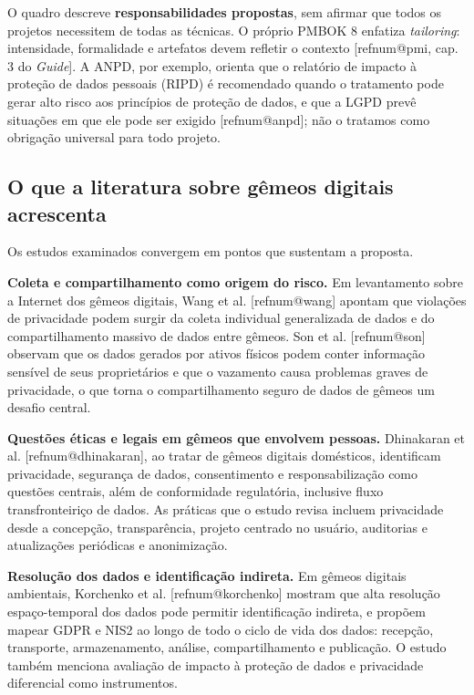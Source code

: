 \documentclass[11pt,a4paper]{article}
\makeatletter
\newcommand{\refnum}[1]{\csname refnum@#1\endcsname}
\makeatother
\begin{document}
O quadro descreve \textbf{responsabilidades propostas}, sem afirmar que todos os projetos necessitem de todas as técnicas. O próprio PMBOK 8 enfatiza \textit{tailoring}: intensidade, formalidade e artefatos devem refletir o contexto [\refnum{pmi}, cap. 3 do \textit{Guide}]. A ANPD, por exemplo, orienta que o relatório de impacto à proteção de dados pessoais (RIPD) é recomendado quando o tratamento pode gerar alto risco aos princípios de proteção de dados, e que a LGPD prevê situações em que ele pode ser exigido [\refnum{anpd}]; não o tratamos como obrigação universal para todo projeto.
\subsection{O que a literatura sobre gêmeos digitais acrescenta}

Os estudos examinados convergem em pontos que sustentam a proposta.

\textbf{Coleta e compartilhamento como origem do risco.} Em levantamento sobre a Internet dos gêmeos digitais, Wang et al. [\refnum{wang}] apontam que violações de privacidade podem surgir da coleta individual generalizada de dados e do compartilhamento massivo de dados entre gêmeos. Son et al. [\refnum{son}] observam que os dados gerados por ativos físicos podem conter informação sensível de seus proprietários e que o vazamento causa problemas graves de privacidade, o que torna o compartilhamento seguro de dados de gêmeos um desafio central.

\textbf{Questões éticas e legais em gêmeos que envolvem pessoas.} Dhinakaran et al. [\refnum{dhinakaran}], ao tratar de gêmeos digitais domésticos, identificam privacidade, segurança de dados, consentimento e responsabilização como questões centrais, além de conformidade regulatória, inclusive fluxo transfronteiriço de dados. As práticas que o estudo revisa incluem privacidade desde a concepção, transparência, projeto centrado no usuário, auditorias e atualizações periódicas e anonimização.

\textbf{Resolução dos dados e identificação indireta.} Em gêmeos digitais ambientais, Korchenko et al. [\refnum{korchenko}] mostram que alta resolução espaço-temporal dos dados pode permitir identificação indireta, e propõem mapear GDPR e NIS2 ao longo de todo o ciclo de vida dos dados: recepção, transporte, armazenamento, análise, compartilhamento e publicação. O estudo também menciona avaliação de impacto à proteção de dados e privacidade diferencial como instrumentos.
\end{document}
